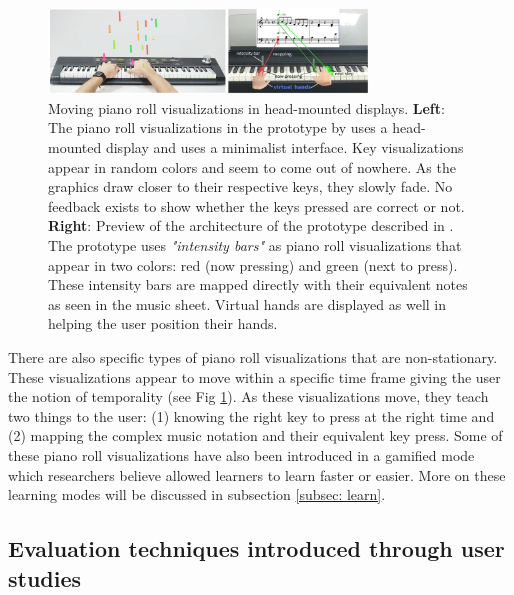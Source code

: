 \documentclass[sigchi, review]{acmart}
\begin{document}
\begin{figure}[t]
    \centering
    \includegraphics[width=8.5cm]{figures/caitrujano.png}
    \caption{Moving piano roll visualizations in head-mounted displays. \textbf{Left}: The piano roll visualizations in the prototype by  \cite{trujano2018arpiano} uses a head-mounted display and uses a minimalist interface. Key visualizations appear in random colors and seem to come out of nowhere. As the graphics draw closer to their respective keys, they slowly fade. No feedback exists to show whether the keys pressed are correct or not.  \textbf{Right}: Preview of the architecture of the prototype described in \cite{cai2019design}. The prototype uses \textit{"intensity bars"} as piano roll visualizations that appear in two colors: red (now pressing) and green (next to press). These intensity bars are mapped directly with their equivalent notes as seen in the music sheet. Virtual hands are displayed as well in helping the user position their hands. }
    \label{fig:caitrujano}
\end{figure}

There are also specific types of piano roll visualizations that are non-stationary. These visualizations appear to move within a specific time frame giving the user the notion of temporality (see Fig \ref{fig:caitrujano}). As these visualizations move, they teach two things to the user: (1) knowing the right key to press at the right time and (2) mapping the complex music notation and their equivalent key press. Some of these piano roll visualizations have also been introduced in a gamified mode \cite{Weing:2013:PEI:2494091.2494113} which researchers believe allowed learners to learn faster or easier. More on these learning modes will be discussed in subsection \ref{subsec: learn}. 




\subsection{Evaluation techniques introduced through user studies}
\label{subsec: eval}
\end{document}
